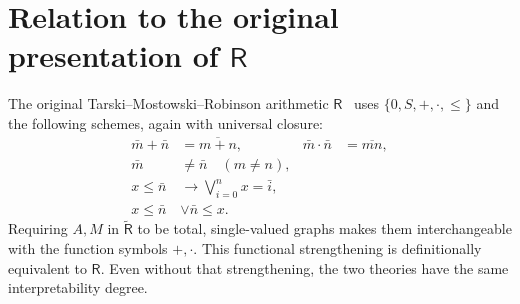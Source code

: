 \documentclass[11pt,a4paper]{article}
\newcommand{\Rt}{\widetilde{\mathsf R}}
\newcommand{\R}{\mathsf R}
\theoremstyle{remark}\newtheorem*{remark}{Remark}
\begin{document}
\section{Relation to the original presentation of \texorpdfstring{$\R$}{R}}\label{sec:nonrelational}
The original Tarski--Mostowski--Robinson arithmetic $\R$~\cite{tmr} uses
$\{0,S,+,\cdot,\le\}$ and the following schemes, again with universal closure:
\begin{align}
 \bar m+\bar n&=\overline{m+n}, &
 \bar m\cdot\bar n&=\overline{mn},
     \tag{R1--R2}\label{r:arithmetic}\\
 \bar m&\ne\bar n\quad(m\ne n), &&
     \tag{R3}\label{r:neq}\\
 x\le\bar n&\longrightarrow\bigvee_{i=0}^{n}x=\bar i, &&
     \tag{R4}\label{r:bound}\\
 x\le\bar n&\lor\bar n\le x. &&
     \tag{R5}\label{r:compare}
\end{align}
Requiring $A,M$ in $\Rt$ to be total, single-valued graphs makes them
interchangeable with the function symbols $+,\cdot$. This functional
strengthening is definitionally equivalent to $\R$. Even without that
strengthening, the two theories have the same interpretability degree.
\end{document}
